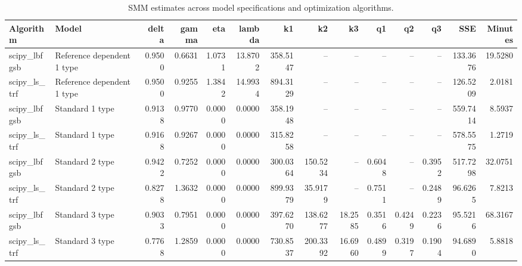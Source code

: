 \begin{table}
\caption{SMM estimates across model specifications and optimization algorithms.}
\label{tab:all_estimates}
\begin{tabular}{llrrrrrrrrrrrr}
\toprule
Algorithm & Model & delta & gamma & eta & lambda & k1 & k2 & k3 & q1 & q2 & q3 & SSE & Minutes \\
\midrule
scipy_lbfgsb & Reference dependent 1 type & 0.9500 & 0.6631 & 1.0731 & 13.8702 & 358.5147 & -- & -- & -- & -- & -- & 133.3676 & 19.5280 \\
scipy_ls_trf & Reference dependent 1 type & 0.9500 & 0.9255 & 1.3842 & 14.9934 & 894.3129 & -- & -- & -- & -- & -- & 126.5209 & 2.0181 \\
scipy_lbfgsb & Standard 1 type & 0.9138 & 0.9770 & 0.0000 & 0.0000 & 358.1948 & -- & -- & -- & -- & -- & 559.7414 & 8.5937 \\
scipy_ls_trf & Standard 1 type & 0.9168 & 0.9267 & 0.0000 & 0.0000 & 315.8258 & -- & -- & -- & -- & -- & 578.5575 & 1.2719 \\
scipy_lbfgsb & Standard 2 type & 0.9422 & 0.7252 & 0.0000 & 0.0000 & 300.0364 & 150.5234 & -- & 0.6048 & -- & 0.3952 & 517.7298 & 32.0751 \\
scipy_ls_trf & Standard 2 type & 0.8278 & 1.3632 & 0.0000 & 0.0000 & 899.9379 & 35.9179 & -- & 0.7511 & -- & 0.2489 & 96.6265 & 7.8213 \\
scipy_lbfgsb & Standard 3 type & 0.9033 & 0.7951 & 0.0000 & 0.0000 & 397.6270 & 138.6277 & 18.2585 & 0.3516 & 0.4249 & 0.2236 & 95.5216 & 68.3167 \\
scipy_ls_trf & Standard 3 type & 0.7768 & 1.2859 & 0.0000 & 0.0000 & 730.8537 & 200.3392 & 16.6960 & 0.4899 & 0.3197 & 0.1904 & 94.6890 & 5.8818 \\
\bottomrule
\end{tabular}
\end{table}
